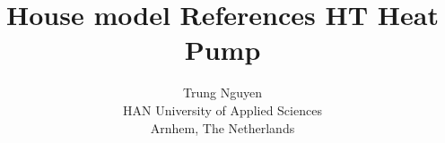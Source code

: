 

\title{House model References HT Heat Pump}
\author{Trung Nguyen\\
HAN University of Applied Sciences\\
Arnhem, The Netherlands}



\ldf

\maketitle


\tableofcontents

\newpage











%
\printbibliography[heading=bibintoc]


